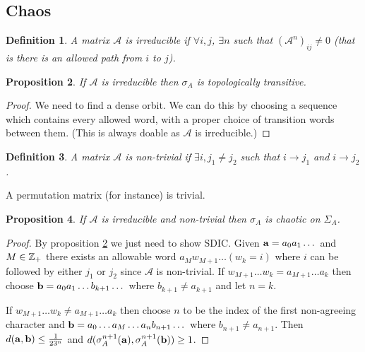 \documentclass{notes}
\newcommand{\cA}{\mathcal{A}}
\theoremstyle{plain}
\newtheorem{proposition}{Proposition}[chapter]
\newtheorem{definition}[proposition]{Definition}
\begin{document}
\subsection{Chaos}

\begin{definition}
A matrix $\cA$ is \emph{irreducible} if $\forall i,j$, $\exists n$ such
that $\left(\cA^n\right)_{ij} \neq 0$ (that is there is an allowed path
from $i$ to $j$).
\end{definition}

\begin{proposition}\label{prop:ttirred}
If $\cA$ is irreducible then $\sigma_A$ is topologically transitive.
\end{proposition}

\begin{proof}
  We need to find a dense orbit.  We can do this by choosing a
  sequence which contains every allowed word, with a proper choice of
  transition words between them.  (This is always doable as $\cA$ is
  irreducible.)
\end{proof}

\begin{definition}
  A matrix $\cA$ is \emph{non-trivial} if $\exists i, j_1 \neq j_2$
  such that $i \to j_1$ and $i \to j_2$.
\end{definition}

A permutation matrix (for instance) is trivial.

\begin{proposition}
If $\cA$ is irreducible and non-trivial then $\sigma_A$ is chaotic on
$\Sigma_A$.
\end{proposition}

\begin{proof}
By proposition \ref{prop:ttirred} we just need to show SDIC.  Given
$\mathbf{a} = a_0 a_1 \dots$ and $M \in \mathbb{Z}_+$ there exists an allowable
word $a_M w_{M+1}\dots (w_k=i)$ where $i$ can be followed by either
$j_1$ or $j_2$ since $\cA$ is non-trivial.  If
$w_{M+1}\dots w_k = a_{M+1}\dots a_k$ then choose
$\mathbf{b} = a_0 a_1\dots b_{k+1}\dots$ where $b_{k+1} \neq a_{k+1}$ and
let $n=k$.

If $w_{M+1}\dots w_k \neq a_{M+1} \dots a_k$ then choose $n$ to be the
index of the first non-agreeing character and
$\mathbf{b} = a_0\dots a_M \dots a_n b_{n+1}\dots$ where $b_{n+1} \neq a_{n+1}$.
Then $d(\mathbf{a},\mathbf{b}) \le \tfrac{1}{2 3^n}$ and
$d(\sigma_A^{n+1}(\mathbf{a}), \sigma_A^{n+1}(\mathbf{b})) \ge 1$.
\end{proof}
\end{document}
